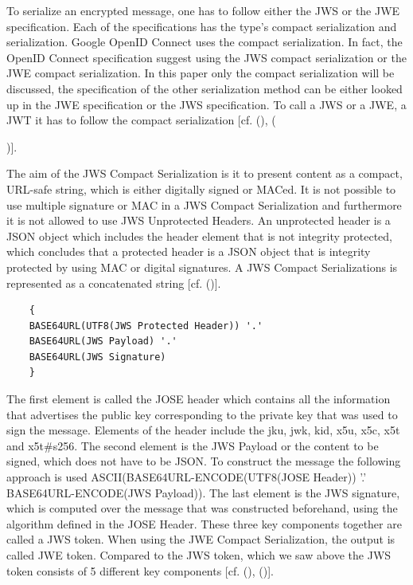 To serialize an encrypted message, one has to follow either the JWS or the JWE specification. Each of the specifications has the type’s compact serialization and serialization. Google OpenID Connect uses the compact serialization. In fact, the OpenID Connect specification suggest using the JWS compact serialization or the JWE compact serialization. In this paper only the compact serialization will be discussed, the specification of the other serialization method can be either looked up in the JWE specification or the JWS specification. To call a JWS or a JWE, a JWT it has to follow the compact serialization [cf. (\cite{JWS:IETF:Jones:2015}), ({\cite{JWE:IETF:Jones:2015})].
	
	The aim of the JWS Compact Serialization is it to present content as a compact, URL-safe string, which is either digitally signed or MACed. It is not possible to use multiple signature or MAC in a JWS Compact Serialization and furthermore it is not allowed to use JWS Unprotected Headers. An unprotected header is a JSON object which includes the header element that is not integrity protected, which concludes that a protected header is a JSON object that is integrity protected by using MAC or digital signatures. A JWS Compact Serializations is represented as a concatenated string [cf. (\cite{JWS:IETF:Jones:2015})].
	
	\begin{lstlisting}
	{
	BASE64URL(UTF8(JWS Protected Header)) '.'
	BASE64URL(JWS Payload) '.'
	BASE64URL(JWS Signature)
	}
	\end{lstlisting}
	
	The first element is called the JOSE header which contains all the information that advertises the public key corresponding to the private key that was used to sign the message. Elements of the header include the jku, jwk, kid, x5u, x5c, x5t and x5t\#s256. The second element is the JWS Payload or the content to be signed, which does not have to be JSON. To construct the message the following approach is used  ASCII(BASE64URL-ENCODE(UTF8(JOSE Header)) '.' BASE64URL-ENCODE(JWS Payload)). 
	The last element is the JWS signature, which is computed over the message that was constructed beforehand, using the algorithm defined in the JOSE Header. These three key components together are called a JWS token. When using the JWE Compact Serialization, the output is called JWE token. Compared to the JWS token, which we saw above the JWS token consists of 5 different key components [cf. (\cite{JWS:IETF:Jones:2015}), (\cite{JWE:IETF:Jones:2015})].
	
}
